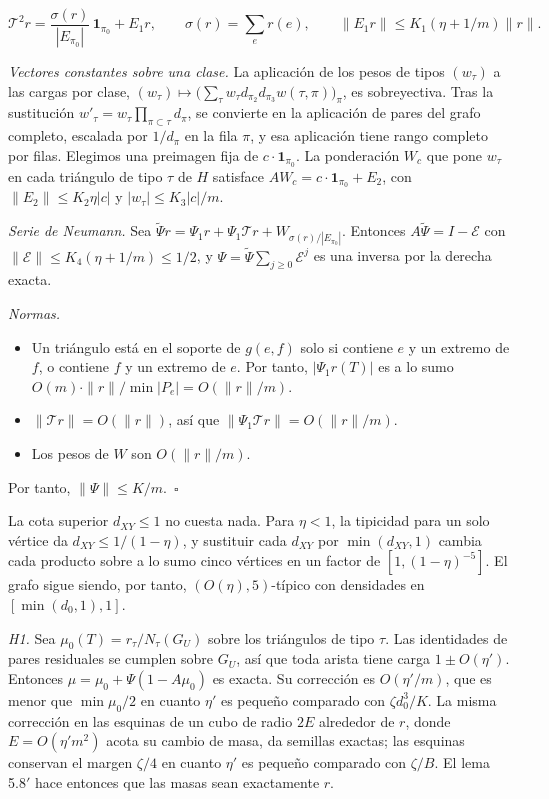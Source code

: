 \documentclass[spanish,11pt,a4paper]{article}
\providecommand{\tightlist}{\setlength{\itemsep}{0pt}\setlength{\parskip}{0pt}}
\begin{document}
\nopagebreak[4]
\[\mathcal T^2r=\frac{\sigma(r)}{|E_{\pi_0}|}\,\mathbf 1_{\pi_0}+E_1r,\qquad \sigma(r)=\sum_e r(e),\qquad \|E_1r\|\le K_1(\eta+1/m)\|r\|.\]

\emph{Vectores constantes sobre una clase.} La aplicación de los pesos de tipos \((w_\tau)\) a las cargas por clase, \((w_\tau)\mapsto\bigl(\sum_\tau w_\tau d_{\pi_2}d_{\pi_3}w(\tau,\pi)\bigr)_\pi\), es sobreyectiva. Tras la sustitución \(w'_\tau=w_\tau\prod_{\pi\subset\tau}d_\pi\), se convierte en la aplicación de pares del grafo completo, escalada por \(1/d_\pi\) en la fila \(\pi\), y esa aplicación tiene rango completo por filas. Elegimos una preimagen fija de \(c\cdot\mathbf 1_{\pi_0}\). La ponderación \(W_c\) que pone \(w_\tau\) en cada triángulo de tipo \(\tau\) de \(H\) satisface \(AW_c=c\cdot\mathbf 1_{\pi_0}+E_2\), con \(\|E_2\|\le K_2\eta|c|\) y \(|w_\tau|\le K_3|c|/m\).

\emph{Serie de Neumann.} Sea \(\tilde\Psi r=\Psi_1r+\Psi_1\mathcal Tr+W_{\sigma(r)/|E_{\pi_0}|}\). Entonces \(A\tilde\Psi=I-\mathcal E\) con \(\|\mathcal E\|\le K_4(\eta+1/m)\le1/2\), y \(\Psi=\tilde\Psi\sum_{j\ge0}\mathcal E^j\) es una inversa por la derecha exacta.

\emph{Normas.}

\begin{itemize}
\tightlist
\item
  Un triángulo está en el soporte de \(g(e,f)\) solo si contiene \(e\) y un extremo de \(f\), o contiene \(f\) y un extremo de \(e\). Por tanto, \(|\Psi_1r(T)|\) es a lo sumo \(O(m)\cdot\|r\|/\min|P_e|=O(\|r\|/m)\).
\item
  \(\|\mathcal Tr\|=O(\|r\|)\), así que \(\|\Psi_1\mathcal Tr\|=O(\|r\|/m)\).
\item
  Los pesos de \(W\) son \(O(\|r\|/m)\).
\end{itemize}

Por tanto, \(\|\Psi\|\le K/m\).~\(\square\)

La cota superior \(d_{XY}\le1\) no cuesta nada. Para \(\eta<1\), la tipicidad para un solo vértice da \(d_{XY}\le1/(1-\eta)\), y sustituir cada \(d_{XY}\) por \(\min(d_{XY},1)\) cambia cada producto sobre a lo sumo cinco vértices en un factor de \([1,(1-\eta)^{-5}]\). El grafo sigue siendo, por tanto, \((O(\eta),5)\)-típico con densidades en \([\min(d_0,1),1]\).

\emph{H1.} Sea \(\mu_0(T)=r_\tau/N_\tau(G_U)\) sobre los triángulos de tipo \(\tau\). Las identidades de pares residuales se cumplen sobre \(G_U\), así que toda arista tiene carga \(1\pm O(\eta')\). Entonces \(\mu=\mu_0+\Psi(1-A\mu_0)\) es exacta. Su corrección es \(O(\eta'/m)\), que es menor que \(\min\mu_0/2\) en cuanto \(\eta'\) es pequeño comparado con \(\zeta d_0^3/K\). La misma corrección en las esquinas de un cubo de radio \(2E\) alrededor de \(r\), donde \(E=O(\eta'm^2)\) acota su cambio de masa, da semillas exactas; las esquinas conservan el margen \(\zeta/4\) en cuanto \(\eta'\) es pequeño comparado con \(\zeta/B\). El lema 5.8\('\) hace entonces que las masas sean exactamente \(r\).
\end{document}
